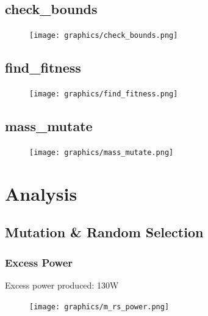 \documentclass{article}
\begin{document}
    \subsection{check\_bounds}
    \begin{figure}[h!]
        \begin{center}
            \texttt{[image: graphics/check\_bounds.png]}
        \end{center}                
    \end{figure}   
    \newpage
    \subsection{find\_fitness}
    \begin{figure}[h!]
        \begin{center}
            \texttt{[image: graphics/find\_fitness.png]}
        \end{center}                
    \end{figure}   
    \subsection{mass\_mutate}
    \begin{figure}[h!]
        \begin{center}
            \texttt{[image: graphics/mass\_mutate.png]}
        \end{center}                
    \end{figure}   


\setcounter{section}{4}
\newpage
\section{Analysis}
    \subsection{Mutation \& Random Selection}
    \subsubsection{Excess Power}
        Excess power produced: 130W
            \begin{figure}[h!]
                \begin{center}
                    \texttt{[image: graphics/m\_rs\_power.png]}
                \end{center}                
                \label{fig:MRSpower}
            \end{figure}        
        
\end{document}
